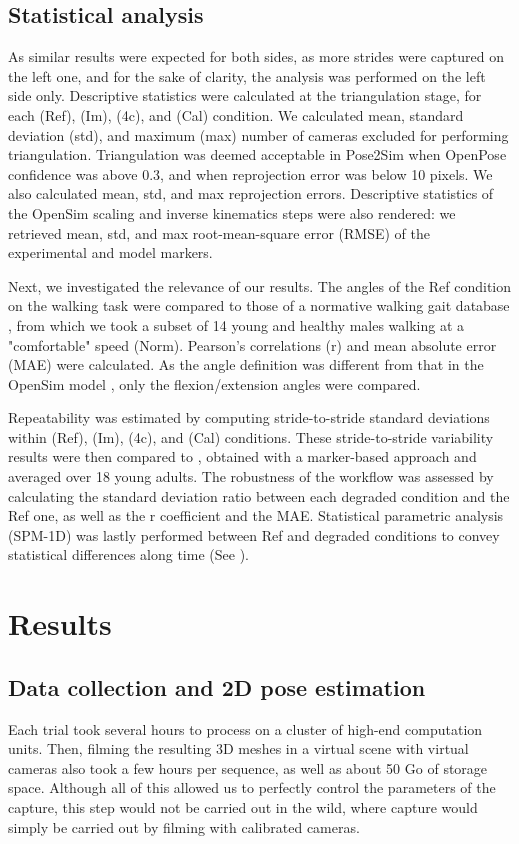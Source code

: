 \subsection{Statistical analysis}

As similar results were expected for both sides, as more strides were captured on the left one, and for the sake of clarity, the analysis was performed on the left side only. Descriptive statistics were calculated at the triangulation stage, for each (Ref), (Im), (4c), and (Cal) condition. We calculated mean, standard deviation (std), and maximum (max) number of cameras excluded for performing triangulation. Triangulation was deemed acceptable in Pose2Sim when OpenPose confidence was above 0.3, and when reprojection error was below 10 pixels. We also calculated mean, std, and max reprojection errors. Descriptive statistics of the OpenSim scaling and inverse kinematics steps were also rendered: we retrieved mean, std, and max root-mean-square error (RMSE) of the experimental and model markers.

Next, we investigated the relevance of our results. The angles of the Ref condition on the walking task were compared to those of a normative walking gait database \cite{Fukuchi2018}, from which we took a subset of 14 young and healthy males walking at a "comfortable" speed (Norm). Pearson’s correlations (r) and mean absolute error (MAE) were calculated. As the angle definition was different from that in the OpenSim model \cite{Trinler2019}, only the flexion/extension angles were compared.

Repeatability was estimated by computing stride-to-stride standard deviations within (Ref), (Im), (4c), and (Cal) conditions. These stride-to-stride variability results were then compared to \cite{Kang2008}, obtained with a marker-based approach and averaged over 18 young adults. The robustness of the workflow was assessed by calculating the standard deviation ratio between each degraded condition and the Ref one, as well as the r coefficient and the MAE. Statistical parametric analysis (SPM-1D) was lastly performed between Ref and degraded conditions to convey statistical differences along time (See \cite{Warmenhoven2018}).


\section{Results}
\subsection{Data collection and 2D pose estimation}
Each trial took several hours to process on a cluster of high-end computation units. Then, filming the resulting 3D meshes in a virtual scene with virtual cameras also took a few hours per sequence, as well as about 50 Go of storage space. Although all of this allowed us to perfectly control the parameters of the capture, this step would not be carried out in the wild, where capture would simply be carried out by filming with calibrated cameras.

